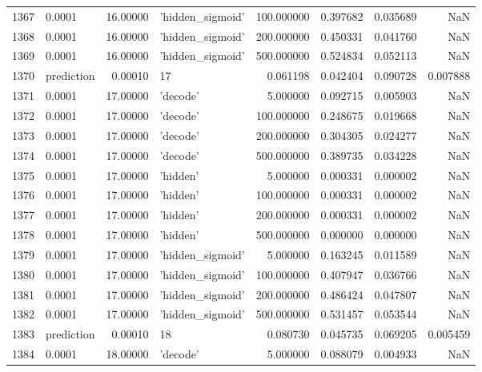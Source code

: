 \documentclass[10pt,a4paper]{article}
\begin{document}
\begin{tabular}{llrlrrrr}
1367 &      0.0001 &  16.00000 &   'hidden\_sigmoid' &  100.000000 &  0.397682 &  0.035689 &       NaN \\
1368 &      0.0001 &  16.00000 &   'hidden\_sigmoid' &  200.000000 &  0.450331 &  0.041760 &       NaN \\
1369 &      0.0001 &  16.00000 &   'hidden\_sigmoid' &  500.000000 &  0.524834 &  0.052113 &       NaN \\
1370 &  prediction &   0.00010 &                 17 &    0.061198 &  0.042404 &  0.090728 &  0.007888 \\
1371 &      0.0001 &  17.00000 &           'decode' &    5.000000 &  0.092715 &  0.005903 &       NaN \\
1372 &      0.0001 &  17.00000 &           'decode' &  100.000000 &  0.248675 &  0.019668 &       NaN \\
1373 &      0.0001 &  17.00000 &           'decode' &  200.000000 &  0.304305 &  0.024277 &       NaN \\
1374 &      0.0001 &  17.00000 &           'decode' &  500.000000 &  0.389735 &  0.034228 &       NaN \\
1375 &      0.0001 &  17.00000 &           'hidden' &    5.000000 &  0.000331 &  0.000002 &       NaN \\
1376 &      0.0001 &  17.00000 &           'hidden' &  100.000000 &  0.000331 &  0.000002 &       NaN \\
1377 &      0.0001 &  17.00000 &           'hidden' &  200.000000 &  0.000331 &  0.000002 &       NaN \\
1378 &      0.0001 &  17.00000 &           'hidden' &  500.000000 &  0.000000 &  0.000000 &       NaN \\
1379 &      0.0001 &  17.00000 &   'hidden\_sigmoid' &    5.000000 &  0.163245 &  0.011589 &       NaN \\
1380 &      0.0001 &  17.00000 &   'hidden\_sigmoid' &  100.000000 &  0.407947 &  0.036766 &       NaN \\
1381 &      0.0001 &  17.00000 &   'hidden\_sigmoid' &  200.000000 &  0.486424 &  0.047807 &       NaN \\
1382 &      0.0001 &  17.00000 &   'hidden\_sigmoid' &  500.000000 &  0.531457 &  0.053544 &       NaN \\
1383 &  prediction &   0.00010 &                 18 &    0.080730 &  0.045735 &  0.069205 &  0.005459 \\
1384 &      0.0001 &  18.00000 &           'decode' &    5.000000 &  0.088079 &  0.004933 &       NaN \\

\end{tabular}
\end{document}
